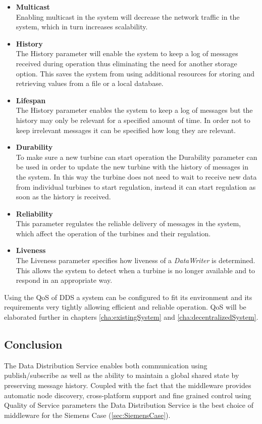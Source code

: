 \begin{itemize}
	\item \textbf{Multicast} \\
		Enabling multicast in the system will decrease the network traffic in the system, which in turn increases scalability.
		
	\item \textbf{History} \\
		The History parameter will enable the system to keep a log of messages received during operation thus eliminating the need for another storage option. This saves the system from using additional resources for storing and retrieving values from a file or a local database.
		
	\item \textbf{Lifespan} \\
		The History parameter enables the system to keep a log of messages but the history may only be relevant for a specified amount of time. In order not to keep irrelevant messages it can be specified how long they are relevant.
	
	\item \textbf{Durability} \\
		To make sure a new turbine can start operation the Durability parameter can be used in order to update the new turbine with the history of messages in the system. In this way the turbine does not need to wait to receive new data from individual turbines to start regulation, instead it can start regulation as soon as the history is received.
		
	\item \textbf{Reliability} \\
		This parameter regulates the reliable delivery of messages in the system, which affect the operation of the turbines and their regulation.
		
	\item \textbf{Liveness} \\
		The Liveness parameter specifies how liveness of a \textit{DataWriter} is determined. This allows the system to detect when a turbine is no longer available and to respond in an appropriate way.
\end{itemize}

Using the QoS of DDS a system can be configured to fit its environment and its requirements very tightly allowing efficient and reliable operation. QoS will be elaborated further in chapters \cref{cha:existingSystem} and \cref{cha:decentralizedSystem}.

\subsection{Conclusion}
The Data Distribution Service enables both communication using publish/subscribe as well as the ability to maintain a global shared state by preserving message history. Coupled with the fact that the middleware provides automatic node discovery, cross-platform support and fine grained control using Quality of Service parameters the Data Distribution Service is the best choice of middleware for the Siemens Case (\cref{sec:SiemensCase}).
